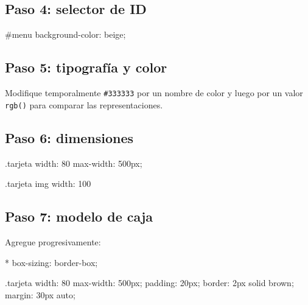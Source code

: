 \documentclass[11pt]{article}
\begin{document}
    \subsection{Paso 4: selector de ID}

    \begin{csscodedark}
        #menu {
            background-color: beige;
        }
    \end{csscodedark}


    \subsection{Paso 5: tipografía y color}


    Modifique temporalmente \texttt{\#333333} por un nombre de color y luego por un valor \texttt{rgb()} para comparar las representaciones.

    \subsection{Paso 6: dimensiones}

    \begin{csscodedark}
        .tarjeta {
            width: 80%
            max-width: 500px;
        }

        .tarjeta img {
            width: 100%
        }
    \end{csscodedark}


    \subsection{Paso 7: modelo de caja}

    Agregue progresivamente:

    \begin{csscodedark}
        * {
            box-sizing: border-box;
        }

        .tarjeta {
            width: 80%
            max-width: 500px;
            padding: 20px;
            border: 2px solid brown;
            margin: 30px auto;
        }
    \end{csscodedark}
\end{document}
